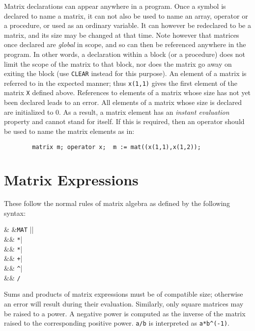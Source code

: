 Matrix declarations can appear anywhere in a program. Once a symbol is
declared to name a matrix, it can not also be used to name an array,
operator or a procedure, or used as an ordinary variable. It can however
be redeclared to be a matrix, and its size may be changed at that time.
Note however that matrices once declared are \emph{global} in scope, and so
can then be referenced anywhere in the program.  In other words, a
declaration within a block (or a procedure) does not limit the scope of
the matrix to that block, nor does the matrix go away on exiting the block
(use \texttt{CLEAR} instead for this purpose).  An element of a matrix is
referred to in the expected manner; thus \texttt{x(1,1)} gives the first
element of the matrix \texttt{X} defined above.  References to elements of a
matrix whose size has not yet been declared leads to an error.  All
elements of a matrix whose size is declared are initialized to 0.  As a
result, a matrix element has an \emph{instant evaluation} property and cannot stand for itself.  If this is required,
then an operator should be used to name the matrix elements as in:
\begin{verbatim}
        matrix m; operator x;  m := mat((x(1,1),x(1,2));
\end{verbatim}

\section{Matrix Expressions}

These follow the normal rules of matrix algebra as defined by the
following syntax:
\begin{syntaxtable}
     & \bnfprod &\texttt{MAT} || \\
          &&   \texttt{*}| \\
      &&       \texttt{*}| \\
      &&       \texttt{+}| \\
      &&       \texttt{\textasciicircum}| \\
      &&       \texttt{/}
\end{syntaxtable}
Sums and products of matrix expressions must be of compatible size;
otherwise an error will result during their evaluation.  Similarly, only
square matrices may be raised to a power.  A negative power is computed as
the inverse of the matrix raised to the corresponding positive power.
\texttt{a/b} is interpreted as \texttt{a*b\textasciicircum (-1)}.


